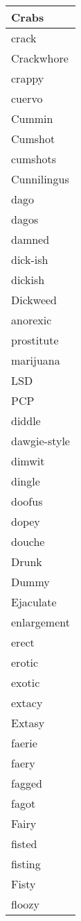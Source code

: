 \begin{longtable}{|l|}
Crabs \\ \hline 
crack \\ \hline 
Crackwhore \\ \hline 
crappy \\ \hline 
cuervo \\ \hline 
Cummin \\ \hline 
Cumshot \\ \hline 
cumshots \\ \hline 
Cunnilingus \\ \hline 
dago \\ \hline 
dagos \\ \hline 
damned \\ \hline 
dick-ish \\ \hline 
dickish \\ \hline 
Dickweed \\ \hline 
anorexic \\ \hline 
prostitute \\ \hline 
marijuana \\ \hline 
LSD \\ \hline 
PCP \\ \hline 
diddle \\ \hline 
dawgie-style \\ \hline 
dimwit \\ \hline 
dingle \\ \hline 
doofus \\ \hline 
dopey \\ \hline 
douche \\ \hline 
Drunk \\ \hline 
Dummy \\ \hline 
Ejaculate \\ \hline 
enlargement \\ \hline 
erect \\ \hline 
erotic \\ \hline 
exotic \\ \hline 
extacy \\ \hline 
Extasy \\ \hline 
faerie \\ \hline 
faery \\ \hline 
fagged \\ \hline 
fagot \\ \hline 
Fairy \\ \hline 
fisted \\ \hline 
fisting \\ \hline 
Fisty \\ \hline 
floozy \\ \hline 

\end{longtable}
